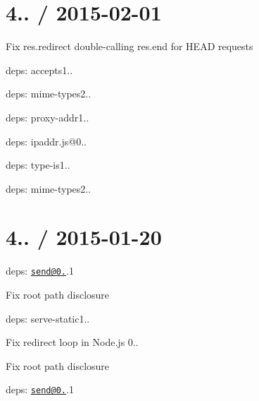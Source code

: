 {\ttfamily \section*{4.. / 2015-\/02-\/01 }}

{\ttfamily }

{\ttfamily 
\begin{DoxyItemize}
\item Fix {\ttfamily res.\+redirect} double-\/calling {\ttfamily res.\+end} for {\ttfamily H\+E\+AD} requests
\item deps\+: accepts1..
\begin{DoxyItemize}
\item deps\+: mime-\/types2..
\end{DoxyItemize}
\item deps\+: proxy-\/addr1..
\begin{DoxyItemize}
\item deps\+: ipaddr.\+js@0..
\end{DoxyItemize}
\item deps\+: type-\/is1..
\begin{DoxyItemize}
\item deps\+: mime-\/types2..
\end{DoxyItemize}
\end{DoxyItemize}}

{\ttfamily \section*{4.. / 2015-\/01-\/20 }}

{\ttfamily }

{\ttfamily 
\begin{DoxyItemize}
\item deps\+: \href{mailto:send@0.11}{\tt send@0.}.1
\begin{DoxyItemize}
\item Fix root path disclosure
\end{DoxyItemize}
\item deps\+: serve-\/static1..
\begin{DoxyItemize}
\item Fix redirect loop in Node.\+js 0..
\item Fix root path disclosure
\item deps\+: \href{mailto:send@0.11}{\tt send@0.}.1
\end{DoxyItemize}
\end{DoxyItemize}}

